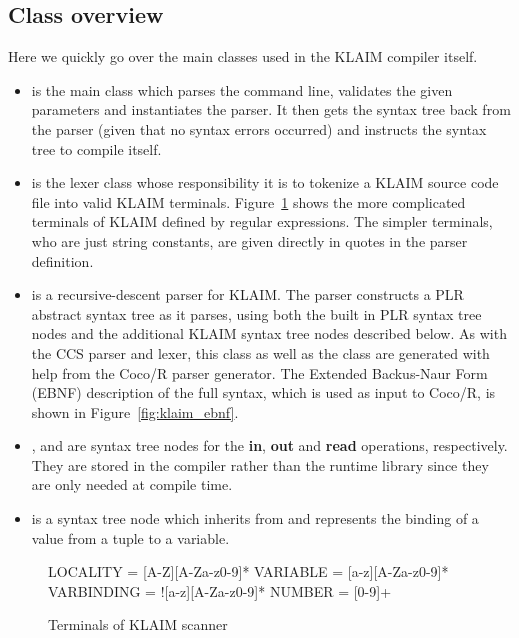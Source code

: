 \subsection{Class overview}
	
	Here we quickly go over the main classes used in the KLAIM compiler itself. 	
	\begin{itemize}
	
	\item {} is the main class which parses the command line, 
	validates the given parameters and instantiates the parser. It then gets the 
	syntax tree back from the parser (given that no syntax errors occurred) and 
	instructs the syntax tree to compile itself.
	
	\item {} is the lexer class whose responsibility it is to 
	tokenize a KLAIM source code file into valid KLAIM terminals. 
	Figure~\ref{fig:klaimterminals} shows the more complicated terminals of 
	KLAIM defined by regular expressions. The simpler terminals, who are just 
	string constants, are given directly in quotes in the parser definition. 
	
  \item {} is a recursive-descent parser for KLAIM. The parser 
  constructs a PLR abstract syntax tree as it parses, using both the built in 
  PLR syntax tree nodes and the additional KLAIM syntax tree nodes described 
  below. As with the CCS parser and lexer, this class as well as the 
   class are generated with help from the Coco/R \cite{cocor} 
  parser generator. The Extended Backus-Naur Form (EBNF) description of the 
  full syntax, which is used as input to Coco/R, is shown in 
  Figure~\ref{fig:klaim_ebnf}.
	
	\item {},  and  are syntax 
	tree nodes for the \textbf{in}, \textbf{out} and \textbf{read} operations, 
	respectively. They are stored in the compiler rather than the runtime 
	library since they are only needed at compile time.
	
	\item {} is a syntax tree node which inherits from 
	 and represents the binding of a value from a tuple to a 
	variable.
	
	\end{itemize}
	
\begin{figure}
\begin{codeblock}
  LOCALITY   = [A-Z][A-Za-z0-9]*
  VARIABLE   = [a-z][A-Za-z0-9]*
  VARBINDING = ![a-z][A-Za-z0-9]*
  NUMBER     = [0-9]+
\end{codeblock}
	\caption{Terminals of KLAIM scanner}\label{fig:klaimterminals}
	\end{figure}
	

